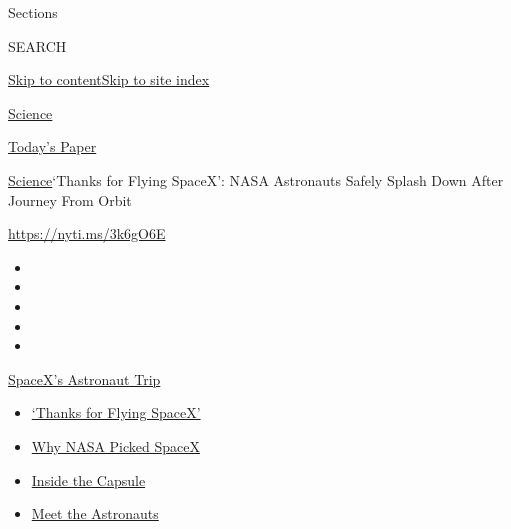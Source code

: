 Sections

SEARCH

\protect\hyperlink{site-content}{Skip to
content}\protect\hyperlink{site-index}{Skip to site index}

\href{https://www.nytimes3xbfgragh.onion/section/science}{Science}

\href{https://myaccount.nytimes3xbfgragh.onion/auth/login?response_type=cookie\&client_id=vi}{}

\href{https://www.nytimes3xbfgragh.onion/section/todayspaper}{Today's
Paper}

\href{/section/science}{Science}\textbar{}`Thanks for Flying SpaceX':
NASA Astronauts Safely Splash Down After Journey From Orbit

\url{https://nyti.ms/3k6gO6E}

\begin{itemize}
\item
\item
\item
\item
\item
\end{itemize}

\href{https://www.nytimes3xbfgragh.onion/2020/08/02/science/spacex-astronauts-splashdown.html?action=click\&pgtype=Article\&state=default\&region=TOP_BANNER\&context=storylines_menu}{SpaceX's
Astronaut Trip}

\begin{itemize}
\tightlist
\item
  \href{https://www.nytimes3xbfgragh.onion/2020/08/02/science/spacex-astronauts-splashdown.html?action=click\&pgtype=Article\&state=default\&region=TOP_BANNER\&context=storylines_menu}{`Thanks
  for Flying SpaceX'}
\item
  \href{https://www.nytimes3xbfgragh.onion/2020/05/26/science/spacex-launch-nasa.html?action=click\&pgtype=Article\&state=default\&region=TOP_BANNER\&context=storylines_menu}{Why
  NASA Picked SpaceX}
\item
  \href{https://www.nytimes3xbfgragh.onion/interactive/2020/05/26/science/spacex-nasa.html?action=click\&pgtype=Article\&state=default\&region=TOP_BANNER\&context=storylines_menu}{Inside
  the Capsule}
\item
  \href{https://www.nytimes3xbfgragh.onion/2020/05/27/science/bob-behnken-doug-hurley.html?action=click\&pgtype=Article\&state=default\&region=TOP_BANNER\&context=storylines_menu}{Meet
  the Astronauts}
\end{itemize}

